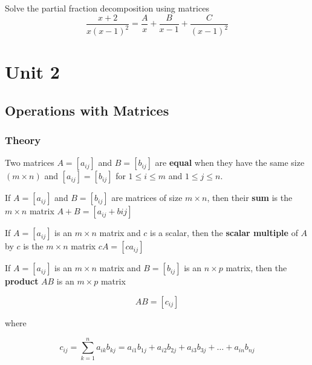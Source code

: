 \documentclass{report}
\begin{document}
\begin{tcolorbox}[colframe = lightred]
		Solve the partial fraction decomposition using matrices 
		$$
		\frac{x+2}{x(x-1)^2} = \frac{A}{x} + \frac{B}{x-1} + \frac{C}{(x-1)^2}
		$$
\end{tcolorbox}


\chapter{Unit 2}

\section{Operations with Matrices}
\subsection{Theory}

\begin{tcolorbox}[title = Definition of Equality of Matrices]
	Two matrices $A = \left[ a_{ij} \right]$ and $B= \left[ b_{ij} \right]$ are \textbf{equal} when they have the same size $(m \times n)$ and $\left[ a_{ij} \right] = \left[ b_{ij} \right]$ for $1 \le i \le m$ and $1 \le j \le n$.

\end{tcolorbox}

\begin{tcolorbox}[title = Definition of Matrix Addition]
	 If $A=\left[ a_{ij} \right]$ and $B=\left[ b_{ij} \right]$ are matrices of size $m \times n$, then their \textbf{sum} is the $m \times n$ matrix $A+B = \left[ a_{ij} + b{ij} \right]$
	 
\end{tcolorbox}

\begin{tcolorbox}[title = Definition of Scalar Multiplication]
	 If $A = \left[ a_{ij} \right]$ is an $m \times n$ matrix and $c$ is a scalar, then the \textbf{scalar multiple} of $A$ by $c$ is the $m \times n$ matrix $cA = \left[ ca_{ij} \right]$
\end{tcolorbox}

\begin{tcolorbox}[title = Definition of Matrix Multiplication]
	If $A = \left[ a_{ij} \right]$ is an $m \times n$ matrix and $B = \left[ b_{ij} \right]$ is an $n \times p$ matrix, then the \textbf{product} $AB$ is an $m \times p$ matrix
	
	$$
	AB = \left[ c_{ij} \right]
	$$
	
	where 
	
	$$
	c_{ij} = \sum_{k=1}^n a_{ik} b_{kj} = a_{i1} b_{1j} + a_{i2}b_{2j} + a_{i3} b_{3j} + \hdots + a_{in} b_{nj}
	$$
	
\end{tcolorbox}
\end{document}
